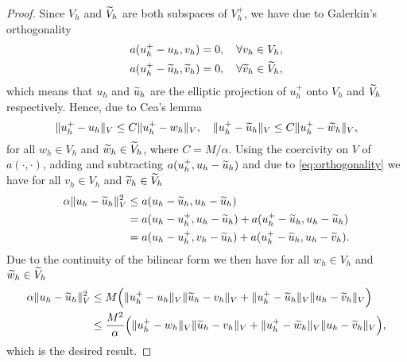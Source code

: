 \documentclass[10pt]{article}
\begin{document}
\begin{proof} Since $V_h$ and $\widetilde V_h$ are both subspaces of $V_h^+$, we have due to Galerkin's orthogonality
	\begin{equation}\label{eq:orthogonality}
	\begin{aligned}
		a(u_h^+ - u_h, v_h) &=0, \quad \forall v_h \in V_h, \\
		a(u_h^+ - \widetilde u_h, \widetilde v_h) &= 0, \quad \forall \widetilde v_h \in \widetilde V_h,
	\end{aligned}
	\end{equation}
	which means that $u_h$ and $\widetilde u_h$ are the elliptic projection of $u_h^+$ onto $V_h$ and $\widetilde V_h$ respectively. Hence, due to Cea's lemma
	\begin{equation}\label{eq:SumSpaceOptimality}
		\lVert u_h^+ - u_h\rVert_V \leq C\lVert u_h^+ - w_h\rVert_V, \quad 	\lVert u_h^+ - \widetilde u_h\rVert_V \leq C\lVert u_h^+ - \widetilde w_h\rVert_V,
	\end{equation}
	for all $w_h \in V_h$ and $\widetilde w_h \in \widetilde V_h$, where $C = M / \alpha$. Using the coercivity on $V$ of $a(\cdot, \cdot)$, adding and subtracting $a(u_h^+, u_h - \widetilde u_h)$ and due to \eqref{eq:orthogonality} we have for all $v_h \in V_h$ and $\widetilde v_h \in \widetilde V_h$
	\begin{equation}
	\begin{aligned}
		\alpha \lVert u_h - \widetilde u_h\rVert_V^2 &\leq a(u_h - \widetilde u_h, u_h - \widetilde u_h)\\
		&= a(u_h - u_h^+, u_h - \widetilde u_h) + a(u_h^+ - \widetilde u_h, u_h - \widetilde u_h)\\
		&= a(u_h - u_h^+, v_h - \widetilde u_h) + a(u_h^+ - \widetilde u_h, u_h - \widetilde v_h).
	\end{aligned}
	\end{equation}
	Due to the continuity of the bilinear form we then have for all $w_h \in V_h$ and $\widetilde w_h \in \widetilde V_h$ 
	\begin{equation}
	\begin{aligned}
		\alpha \lVert u_h - \widetilde u_h\rVert_V^2 &\leq M \Big(\lVert u_h^+ - u_h\rVert_V\lVert\widetilde u_h - v_h\rVert_V + \lVert u_h^+ - \widetilde u_h\rVert_V\lVert u_h - \widetilde v_h\rVert_V\Big)\\
		&\leq \frac{M^2}{\alpha} \Big(\lVert u_h^+ - w_h\rVert_V\lVert\widetilde u_h - v_h\rVert_V + \lVert u_h^+ - \widetilde w_h\rVert_V\lVert u_h - \widetilde v_h\rVert_V\Big),
	\end{aligned}
	\end{equation}
	which is the desired result.
\end{proof}
\end{document}
